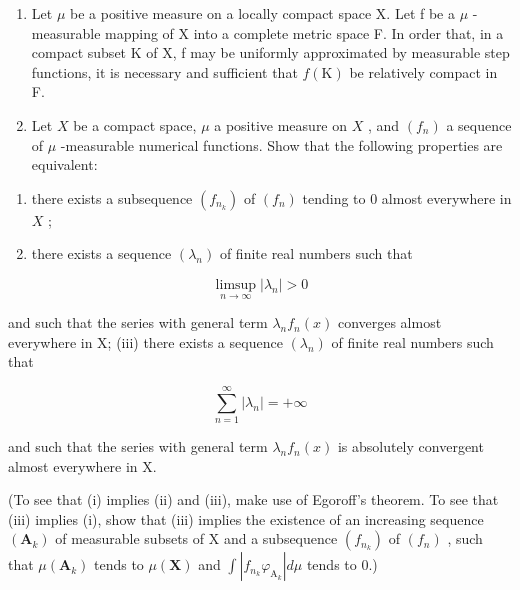 \begin{enumerate}
\def\labelenumi{\arabic{enumi})}
\setcounter{enumi}{18}
\item
  Let \(\mu\) be a positive measure on a locally compact space X. Let f be a \(\mu\) -measurable mapping of X into a complete metric space F. In order that, in a compact subset K of X, f may be uniformly approximated by measurable step functions, it is necessary and sufficient that \(f(\mathrm{K})\) be relatively compact in F.
\item
  Let \(X\) be a compact space, \(\mu\) a positive measure on \(X\) , and \((f_n)\) a sequence of \(\mu\) -measurable numerical functions. Show that the following properties are equivalent:
\end{enumerate}

\begin{enumerate}
\def\labelenumi{(\roman{enumi})}
\item
  there exists a subsequence \((f_{n_k})\) of \((f_n)\) tending to 0 almost everywhere in \(X\) ;
\item
  there exists a sequence \((\lambda_{n})\) of finite real numbers such that
\end{enumerate}

\[
\limsup _ {n \to \infty} | \lambda_ {n} | > 0
\]

and such that the series with general term \(\lambda_{n}f_{n}(x)\) converges almost everywhere in X; (iii) there exists a sequence \((\lambda_n)\) of finite real numbers such that

\[
\sum_ {n = 1} ^ {\infty} | \lambda_ {n} | = + \infty
\]

and such that the series with general term \(\lambda_{n}f_{n}(x)\) is absolutely convergent almost everywhere in X.

(To see that (i) implies (ii) and (iii), make use of Egoroff's theorem. To see that (iii) implies (i), show that (iii) implies the existence of an increasing sequence \((\mathbf{A}_k)\) of measurable subsets of X and a subsequence \((f_{n_k})\) of \((f_n)\) , such that \(\mu (\mathbf{A}_k)\) tends to \(\mu (\mathbf{X})\) and \(\int |f_{n_k}\varphi_{\mathrm{A}_k}|d\mu\) tends to 0.)

